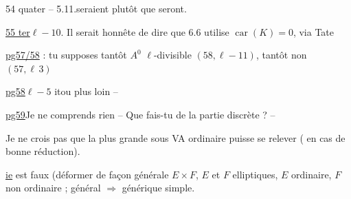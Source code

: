 54 quater -- 5.11.\quad seraient plutôt que seront.

\uline{55 ter}\quad $\ell-10$. Il serait honnête de dire que 6.6 utilise $\operatorname{car}(K)=0$, via Tate



\uline{pg57/58} : tu supposes tantôt $A^0$ $\ell$-divisible $(58,\ell-11)$, tantôt non $(57,\ell\,3)$

\uline{pg58}\quad $\ell-5$\quad
{}
\qquad itou plus loin --

\uline{pg59}\quad Je ne comprends rien -- Que fais-tu de la partie discrète ? --

Je ne crois pas que la plus grande  sous VA ordinaire puisse se relever ( en cas de bonne réduction).

\uline{ie}\quad {} est faux (déformer de façon générale $E\times F$, $E$ et $F$ elliptiques, $E$ ordinaire, $F$ non ordinaire ; général $\Rightarrow$ générique simple.

